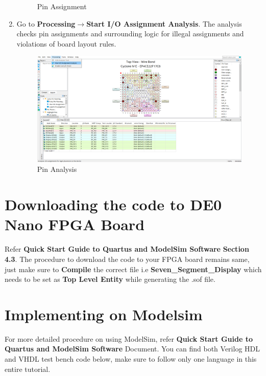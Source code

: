 \documentclass[12pt,singleside,a4paper]{article}
\begin{document}
\begin{enumerate}
\begin{figure}[H]
    \caption{Pin Assignment}
    \end{figure}

   \newpage 
    \item Go to \textbf{Processing}$\rightarrow$\textbf{Start I/O Assignment Analysis}. The analysis checks pin assignments and surrounding logic for illegal assignments and violations of board layout rules.
    \begin{figure}[H]
    \centering
    \includegraphics[width=12cm,keepaspectratio]{Project/Create10.png}
    \caption{Pin Analysis}
    \end{figure}
    
    \end{enumerate}

\section{Downloading the code to DE0 Nano FPGA Board}
Refer \textbf{Quick Start Guide to Quartus and ModelSim Software} \textbf{Section 4.3}.
The procedure to download the code to your FPGA board remains same, just make sure to \textbf{Compile} the correct file i.e \textbf{Seven\_Segment\_Display} which needs to be set as \textbf{Top Level Entity} while generating the .sof file.


\section{Implementing on Modelsim }
For more detailed procedure on using ModelSim, refer \textbf{Quick Start Guide to Quartus and ModelSim Software} Document. You can find both Verilog HDL and VHDL test bench code below, make sure to follow only one language in this entire tutorial.
\end{document}
